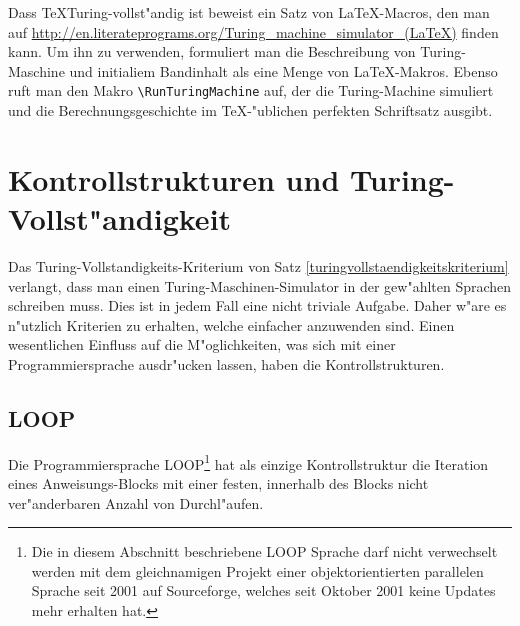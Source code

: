 Dass \TeX Turing-vollst"andig ist beweist ein Satz von \LaTeX-Macros, den
man auf
\url{http://en.literateprograms.org/Turing\_machine\_simulator\_(LaTeX)}
finden kann.
Um ihn zu verwenden, formuliert man die Beschreibung
von Turing-Maschine und initialiem Bandinhalt als eine Menge von
\LaTeX-Makros. Ebenso ruft man den Makro \verb+\RunTuringMachine+ auf,
der die Turing-Machine simuliert und die Berechnungsgeschichte im
\TeX-"ublichen perfekten Schriftsatz ausgibt.



\section{Kontrollstrukturen und Turing-Vollst"andigkeit}
Das Turing-Vollstandigkeits-Kriterium von Satz
\ref{turingvollstaendigkeitskriterium} verlangt, dass man einen
Turing-Maschinen-Simulator in der gew"ahlten Sprachen schreiben muss.
Dies ist in jedem Fall eine nicht triviale Aufgabe.
Daher w"are es n"utzlich Kriterien zu erhalten, welche einfacher
anzuwenden sind. Einen wesentlichen Einfluss auf die M"oglichkeiten,
was sich mit einer Programmiersprache ausdr"ucken lassen, haben die
Kontrollstrukturen.

\subsection{LOOP}
Die Programmiersprache
LOOP\footnote{Die in diesem Abschnitt beschriebene
LOOP Sprache darf nicht verwechselt werden mit dem gleichnamigen
Projekt einer objektorientierten parallelen Sprache seit
2001 auf Sourceforge, welches seit Oktober 2001 keine Updates mehr
erhalten hat.}
hat als einzige Kontrollstruktur die
Iteration eines Anweisungs-Blocks mit einer festen, innerhalb des
Blocks nicht ver"anderbaren Anzahl von Durchl"aufen.

